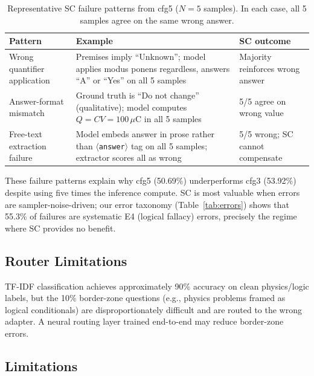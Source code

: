 \documentclass[cmc,journal,article,submit,moreauthors,pdftex]{Definitions/tsp}
\begin{document}
\begin{table}[H]
  \tablesize{\footnotesize}
  \caption{Representative SC failure patterns from cfg5 ($N=5$ samples).
           In each case, all 5 samples agree on the same wrong answer.}
  \label{tab:sc_failures}
  \begin{tabularx}{\textwidth}{lXC}
    \toprule
    \textbf{Pattern} & \textbf{Example} & \textbf{SC outcome} \\
    \midrule
    Wrong quantifier application
      & Premises imply ``Unknown''; model applies modus ponens regardless,
        answers ``A'' or ``Yes'' on all 5 samples
      & Majority reinforces wrong answer \\
    \addlinespace
    Answer-format mismatch
      & Ground truth is ``Do not change'' (qualitative); model computes
        $Q = CV = 100\,\mu\text{C}$ in all 5 samples
      & 5/5 agree on wrong value \\
    \addlinespace
    Free-text extraction failure
      & Model embeds answer in prose rather than
        $\langle$\texttt{answer}$\rangle$ tag on all 5 samples;
        extractor scores all as wrong
      & 5/5 wrong; SC cannot compensate \\
    \bottomrule
  \end{tabularx}
\end{table}

These failure patterns explain why cfg5 (50.69\%) underperforms cfg3
(53.92\%) despite using five times the inference compute.
SC is most valuable when errors are sampler-noise-driven; our error taxonomy (Table~\ref{tab:errors}) shows that 55.3\% of
failures are systematic E4 (logical fallacy) errors, precisely the
regime where SC provides no benefit.


\subsection{Router Limitations}

TF-IDF classification achieves approximately 90\% accuracy on clean
physics/logic labels, but the 10\% border-zone questions (e.g., physics
problems framed as logical conditionals) are disproportionately difficult
and are routed to the wrong adapter.
A neural routing layer trained end-to-end may reduce border-zone errors.

\subsection{Limitations}
\end{document}
